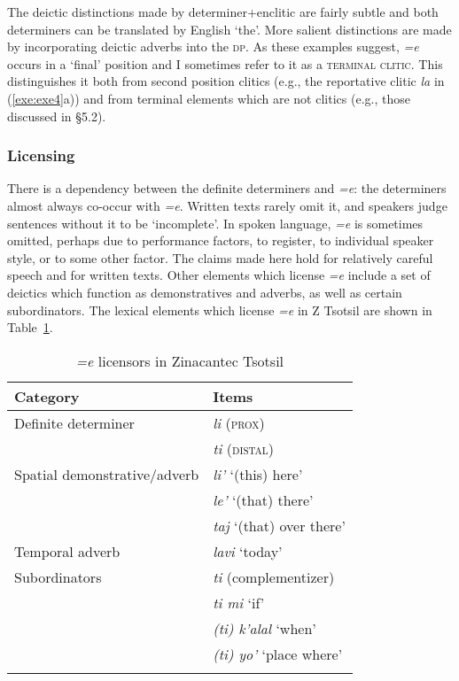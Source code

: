 \documentclass[output=paper,
modfonts
]{LSP/langsci}
\begin{document}
The deictic distinctions made by determiner+enclitic are fairly subtle and both determiners can be translated by English `the'. 
More salient distinctions are made by incorporating deictic adverbs into the \textsc{dp}. 
As these examples suggest, \emph{=e} occurs in a `final' position and I sometimes refer to it 
as a \textsc{terminal clitic}. This
distinguishes it both from second position clitics (e.g., the reportative clitic \emph{la} in (\ref{exe:exe4}a)) and from 
terminal elements which are not clitics (e.g., those discussed in \S5.2). 

\subsubsection{Licensing}
There is a dependency between the definite determiners and \emph{=e}: 
the determiners almost always co-occur with  \emph{=e}. Written texts rarely omit it, and
speakers judge sentences without it to be `incomplete'. In spoken language,  \emph{=e} is sometimes omitted, 
perhaps due to performance factors, to register, to individual speaker style, or to some other factor. 
The claims made here hold for relatively careful speech and for written texts. Other elements which license \emph{=e} include
a set of deictics which function as demonstratives and adverbs, as well as certain subordinators. The lexical elements which license \emph{=e} in Z Tsotsil are shown in Table~\ref{table:licensors}.
\begin{table}
	\begin{tabular} {l l}
		\lsptoprule
		Category & Items \\
		\midrule
		Definite determiner & \emph{li} (\textsc{prox})\\
		& \emph{ti} (\textsc{distal}) \\[1.5ex]
		Spatial demonstrative/adverb  & \emph{li'} `(this) here'\\
		& \emph{le'} `(that) there' \\
		& \emph{taj} `(that) over there'  \\[1.5ex]
		Temporal adverb &  \emph{lavi} `today'  \\[1.5ex]
		Subordinators & \emph{ti} (complementizer) \\
		& \emph{ti mi} `if'\\
		& \emph{(ti) k'alal} `when' \\
		& \emph{(ti) yo'} `place where'  \\
		\lspbottomrule
	\end{tabular}
	\caption{\emph{=e} licensors in Zinacantec Tsotsil}
	\label{table:licensors}
\end{table}
\end{document}
